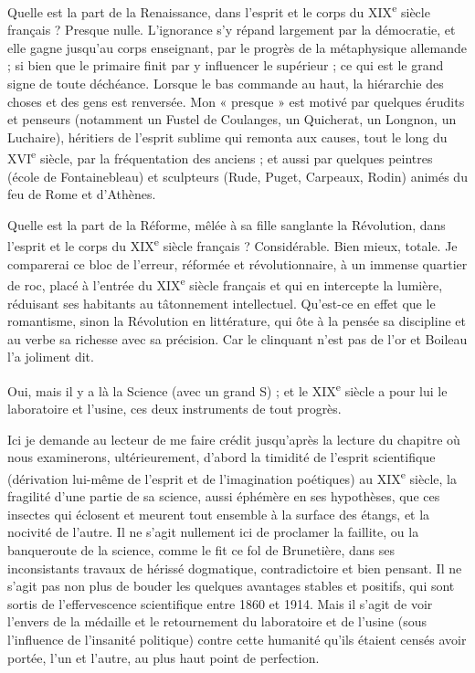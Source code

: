 \documentclass[french,twoside]{book} %
\begin{document}
Quelle est la part de la Renaissance, dans l’esprit et le corps du XIX\textsuperscript{e} siècle français ? Presque nulle. L’ignorance s’y répand largement par la démocratie, et elle gagne jusqu’au corps enseignant, par le progrès de la métaphysique allemande ; si bien que le primaire finit par y influencer le supérieur ; ce qui est le grand signe de toute déchéance. Lorsque le bas commande au haut, la hiérarchie des choses et des gens est renversée. Mon « presque » est motivé par quelques érudits et penseurs (notamment un Fustel de Coulanges, un Quicherat, un Longnon, un Luchaire), héritiers de l’esprit sublime qui remonta aux causes, tout le long du XVI\textsuperscript{e} siècle, par la fréquentation des anciens ; et aussi par quelques peintres (école de Fontainebleau) et sculpteurs (Rude, Puget, Carpeaux, Rodin) animés du feu de Rome et d’Athènes.\par
Quelle est la part de la Réforme, mêlée à sa fille sanglante la Révolution, dans l’esprit et le corps du XIX\textsuperscript{e} siècle français ? Considérable. Bien mieux, totale. Je comparerai ce bloc de l’erreur, réformée et révolutionnaire, à un immense quartier de roc, placé à l’entrée du XIX\textsuperscript{e} siècle français et qui en intercepte la lumière, réduisant ses habitants au tâtonnement intellectuel. Qu’est-ce en effet que le romantisme, sinon la Révolution en littérature, qui ôte à la pensée sa discipline et au verbe sa richesse avec sa précision. Car le clinquant n’est pas de l’or et Boileau l’a joliment dit.\par
Oui, mais il y a là la Science (avec un grand S) ; et le XIX\textsuperscript{e} siècle a pour lui le laboratoire et l’usine, ces deux instruments de tout progrès.\par
Ici je demande au lecteur de me faire crédit jusqu’après la lecture du chapitre où nous examinerons, ultérieurement, d’abord la timidité de l’esprit scientifique (dérivation lui-même de l’esprit et de l’imagination poétiques) au XIX\textsuperscript{e} siècle, la fragilité d’une partie de sa science, aussi éphémère en ses hypothèses, que ces insectes qui éclosent et meurent tout ensemble à la surface des étangs, et la nocivité de l’autre. Il ne s’agit nullement ici de proclamer la faillite, ou la banqueroute de la science, comme le fit ce fol de Brunetière, dans ses inconsistants travaux de hérissé dogmatique, contradictoire et bien pensant. Il ne s’agit pas non plus de bouder les quelques avantages stables et positifs, qui sont sortis de l’effervescence scientifique entre 1860 et 1914. Mais il s’agit de voir l’envers de la médaille et le retournement du laboratoire et de l’usine (sous l’influence de l’insanité politique) contre cette humanité qu’ils étaient censés avoir portée, l’un et l’autre, au plus haut point de perfection.\par
\end{document}
